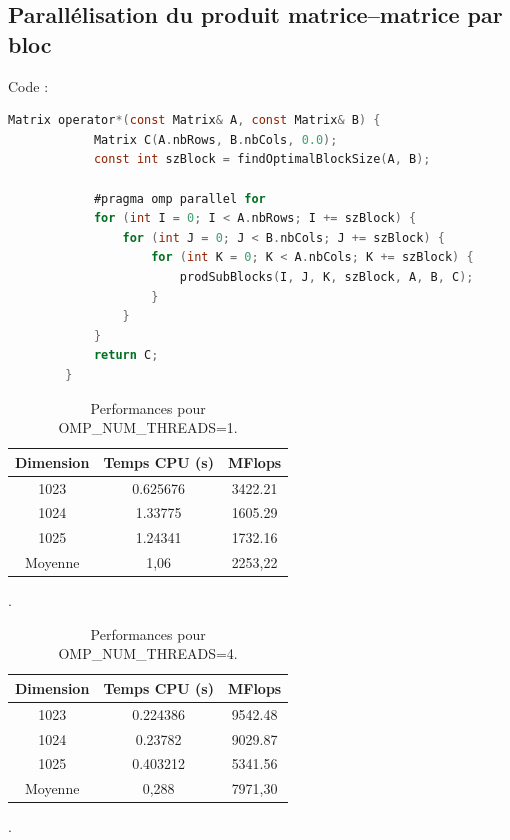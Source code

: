 \documentclass[a4paper,13pt]{book}
\begin{document}
\subsection{Parallélisation du produit matrice–matrice par bloc}


Code :  \\

	\begin{lstlisting}[language=C]
        Matrix operator*(const Matrix& A, const Matrix& B) {
            Matrix C(A.nbRows, B.nbCols, 0.0);
            const int szBlock = findOptimalBlockSize(A, B);
        
            #pragma omp parallel for
            for (int I = 0; I < A.nbRows; I += szBlock) {
                for (int J = 0; J < B.nbCols; J += szBlock) {
                    for (int K = 0; K < A.nbCols; K += szBlock) {
                        prodSubBlocks(I, J, K, szBlock, A, B, C);
                    }
                }
            }
            return C;
        }
\end{lstlisting}


\begin{table}[h!]
    \begin{center}
    \begin{tabular}{|c|c|c|}
        \hline
        Dimension & Temps CPU (s) & MFlops \\ \hline
        1023      & 0.625676       & 3422.21 \\ \hline
        1024      & 1.33775       & 1605.29 \\ \hline
        1025      & 1.24341        & 1732.16 \\ \hline
        Moyenne      & 1,06        & 2253,22 \\ \hline
    \end{tabular}
    \caption{Performances pour OMP\_NUM\_THREADS=1.}
\end{center}
\end{table}.

\begin{table}[h!]
    \begin{center}
    \begin{tabular}{|c|c|c|}
        \hline
        Dimension & Temps CPU (s) & MFlops \\ \hline
        1023      & 0.224386       & 9542.48 \\ \hline
        1024      & 0.23782       & 9029.87 \\ \hline
        1025      & 0.403212        & 5341.56 \\ \hline
        Moyenne      & 0,288        & 7971,30 \\ \hline
    \end{tabular}
    \caption{Performances pour OMP\_NUM\_THREADS=4.}
\end{center}
\end{table}.
\end{document}
